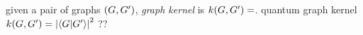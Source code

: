 
\begin{definition}\label{def:graph_kernel}
	given a pair of graphs $(G,G')$,
	\emph{graph kernel} is $k (G,G')  =$.
	quantum graph kernel $\kernel (\graph,\graph')  = \abs{\ip{\graph}{\graph'}}^2$ ??
	\cite{baiQuantumJensenShannon2015}	
\end{definition}

